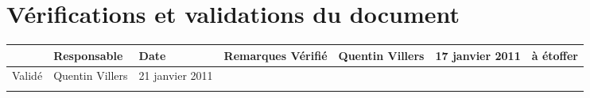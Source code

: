 
\section*{Vérifications et validations du document}

\begin{center}
\begin{longtable}{|m{15mm}|m{36mm}|m{36mm}|m{60mm}|}
\hline
 & Responsable & Date & Remarques\endhead \hline
Vérifié
& %
Quentin Villers
& %
17 janvier 2011
& %
à  étoffer
\\\hline
Validé
& %
Quentin Villers
& %
21 janvier 2011
& %

\\\hline

& %

& %

& %

\\\hline
\end{longtable}
\end{center}

\pagebreak
